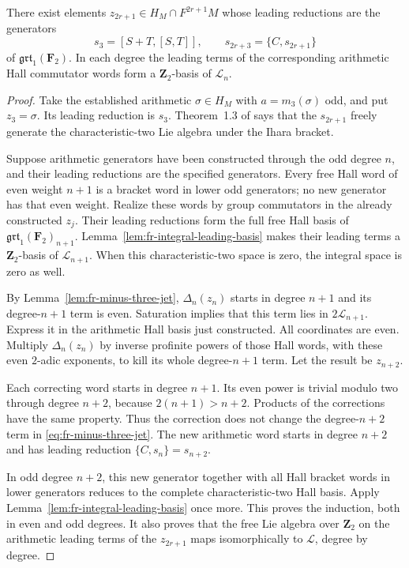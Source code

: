 \begin{proposition}\label{prop:fr-all-odd-arithmetic-generators}
There exist elements $z_{2r+1}\in H_M\cap F^{2r+1}M$
whose leading reductions are the generators
\[
 s_3=[S+T,[S,T]],\qquad
 s_{2r+3}=\{C,s_{2r+1}\}
\]
of $\mathfrak{grt}_1(\mathbf F_2)$.
In each degree the leading terms of the corresponding
arithmetic Hall commutator words form a
$\mathbf Z_2$-basis of $\mathcal L_n$.
\end{proposition}

\begin{proof}
Take the established arithmetic $\sigma\in H_M$ with
$a=m_3(\sigma)$ odd, and put $z_3=\sigma$.
Its leading reduction is $s_3$. Theorem~1.3 of
\cite[p.~2]{Willwacher} says that the $s_{2r+1}$ freely
generate the characteristic-two Lie algebra under the
Ihara bracket.

Suppose arithmetic generators have been constructed through
the odd degree $n$, and their leading reductions are the
specified generators. Every free Hall word of even weight
$n+1$ is a bracket word in lower odd generators; no new
generator has that even weight. Realize these words by
group commutators in the already constructed $z_j$.
Their leading reductions form the full free Hall basis of
$\mathfrak{grt}_1(\mathbf F_2)_{n+1}$.
Lemma~\ref{lem:fr-integral-leading-basis} makes their leading
terms a $\mathbf Z_2$-basis of $\mathcal L_{n+1}$.
When this characteristic-two space is zero, the integral
space is zero as well.

By Lemma~\ref{lem:fr-minus-three-jet},
$\Delta_n(z_n)$ starts in degree $n+1$ and its degree-$n+1$
term is even. Saturation implies that this term lies in
$2\mathcal L_{n+1}$. Express it in the arithmetic Hall basis
just constructed. All coordinates are even.
Multiply $\Delta_n(z_n)$ by inverse profinite powers of
those Hall words, with these even $2$-adic exponents, to
kill its whole degree-$n+1$ term.
Let the result be $z_{n+2}$.

Each correcting word starts in degree $n+1$. Its even
power is trivial modulo two through degree $n+2$, because
$2(n+1)>n+2$. Products of the corrections have the same
property. Thus the correction does not change the
degree-$n+2$ term in
\eqref{eq:fr-minus-three-jet}. The new arithmetic word
starts in degree $n+2$ and has leading reduction
$\{C,s_n\}=s_{n+2}$.

In odd degree $n+2$, this new generator together with all
Hall bracket words in lower generators reduces to the
complete characteristic-two Hall basis. Apply
Lemma~\ref{lem:fr-integral-leading-basis} once more.
This proves the induction, both in even and odd degrees.
It also proves that the free Lie algebra over $\mathbf Z_2$
on the arithmetic leading terms of the $z_{2r+1}$ maps
isomorphically to $\mathcal L$, degree by degree.
\end{proof}

